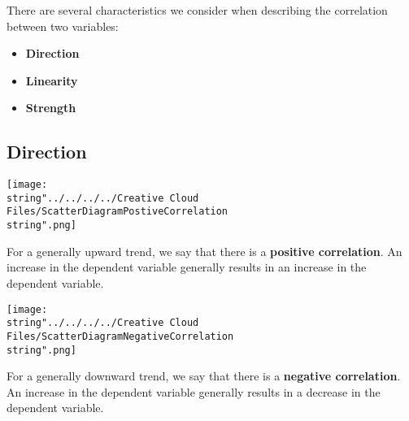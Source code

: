 \documentclass[11pt,a4paper]{book}
\begin{document}
There are several characteristics we consider when describing the
correlation between two variables:

\begin{itemize}

\item  \textbf{Direction}

\item  \textbf{Linearity}

\item  \textbf{Strength}

\end{itemize}

\subsection{Direction}

\begin{minipage}{.35\textwidth}
\begin{center}
\texttt{[image: \\string"../../../../Creative Cloud Files/ScatterDiagramPostiveCorrelation\\string".png]}
\par\end{center}

\end{minipage}
\begin{minipage}{.6\textwidth}

For a generally upward trend, we say that there is a \textbf{positive
correlation}. An increase in the dependent variable generally results
in an increase in the dependent variable.

\end{minipage}

\begin{minipage}{.35\textwidth}
\begin{center}
\texttt{[image: \\string"../../../../Creative Cloud Files/ScatterDiagramNegativeCorrelation\\string".png]}
\par\end{center}

\end{minipage}
\begin{minipage}{.6\textwidth}

For a generally downward trend, we say that there is a \textbf{negative
correlation}. An increase in the dependent variable generally results
in a decrease in the dependent variable.

\end{minipage}
\end{document}
